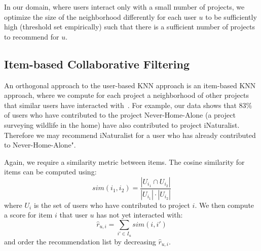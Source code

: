 \documentclass[letterpaper]{article} %
\begin{document}
In our domain, where users interact only with a small number of projects, we optimize the size of the neighborhood differently for each user $u$ to be sufficiently high (threshold set empirically) such that there is a sufficient number of projects to recommend for $u$.


\subsection{Item-based Collaborative Filtering}

An orthogonal approach to the user-based KNN approach is an item-based KNN approach, where we compute for each project a neighborhood of other projects that similar users have interacted with~\cite{schafer2007collaborative}. For example,  our data shows that 83\% of users who have contributed to the project Never-Home-Alone (a project surveying
wildlife in the home) have  also
 contributed to project iNaturalist. Therefore we may  recommend  iNaturalist for a user who has already contributed to Never-Home-Alone".

Again, we require a similarity metric between items. The cosine similarity for items can be computed using:
\begin{equation}
    sim(i_1,i_2)= \frac{|U_{i_1} \cap U_{i_2}|}{|U_{i_1}| \cdot |U_{i_2}|}
\end{equation}
where $U_i$ is the set of users who have contributed to project $i$.
We then compute a score for item $i$ that user $u$ has not yet interacted with:
\begin{equation}
    \hat{r}_{u,i}=\sum_{i' \in I_u} sim(i,i')
\end{equation}
and order the recommendation list by decreasing $\hat{r}_{u,i}$.



\end{document}
